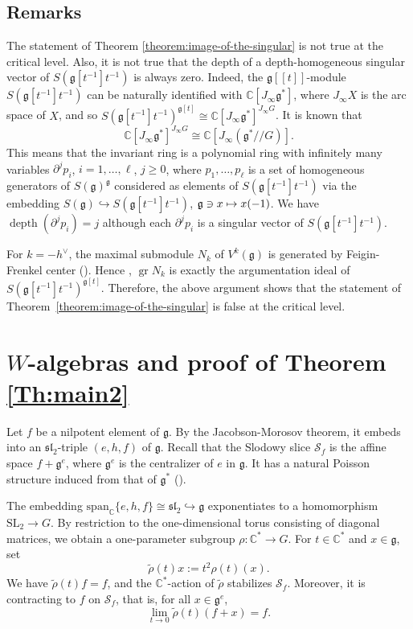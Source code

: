 \documentclass[JEP,XML,SOM,Unicode]{cedram}
\let\oldvee\vee
\renewcommand{\vee}{{\scriptscriptstyle\oldvee}}
\newcommand{\lcr}{[\![}
\newcommand{\rcr}{]\!]}
\newcommand\mto{\mathchoice{\longmapsto}{\mapsto}{\mapsto}{\mapsto}}
\let\on\operatorname
\newcommand\C{{\mathbb C}}
\newcommand \g{\mathfrak g}
\theoremstyle{definition}
\begin{document}
\subsection{Remarks}\label{subsection:remark}
The statement of Theorem \ref{theorem:image-of-the-singular}
is not true at the critical level.
Also,
it is not true that
the depth of a depth-homogeneous singular vector of $S(\g[t^{-1}]t^{-1})$ is
always zero.
Indeed,
the $\g\lcr t\rcr$-module
$S(\g[t^{-1}]t^{-1})$
can be naturally identified with $\C[J_{\infty}\g^*]$,
where $J_{\infty}X$ is the arc space of $X$,
and so
$S(\g[t^{-1}]t^{-1})^{\g[t]}\cong \C[J_{\infty}\g^*]^{J_{\infty}G}$.
It is known \cite{RaiTau92,BeiDri,EisFre01} that
\begin{equation*}
\C[J_{\infty}\g^*]^{J_{\infty}G}\cong \C[J_{\infty}(\g^*/\!/G)].
\end{equation*}
This means that
the invariant ring is a polynomial ring with infinitely many
variables
$\partial^j p_i$,
$i=1,\dots, \ell$,
$j\geq 0$,
where
$p_1,\dots, p_{\ell}$ is a set of homogeneous generators of
$S(\g)^\g$
considered as elements of
$S(\g[t^{-1}]t^{-1})$ via the embedding
$S(\g)\hookrightarrow S(\g[t^{-1}]t^{-1})$,
$\g\ni x\mto x(-1)$.
We have $\on{depth}(\partial^j p_i)=j$
although
each $\partial^j p_i$ is a singular vector
of $S(\g[t^{-1}]t^{-1})$.

For $k=-h^{\vee}$,
the maximal submodule $N_k$ of $V^k(\g)$
is generated by Feigin-Frenkel center (\cite{FreGai04}).
Hence \cite{FeiFre92,Fre05},
$\on{gr}N_{k}$ is exactly the
argumentation ideal of
$S(\g[t^{-1}]t^{-1})^{\g[t]}$.
Therefore,
the above argument shows that
the statement of Theorem~\ref{theorem:image-of-the-singular}
is false at the critical level.

\section{\texorpdfstring{$W$}{W}-algebras and proof of Theorem \ref{Th:main2}}
\label{sec:W-algebras}
Let $f$ be a nilpotent element of $\g$. By the Jacobson-Morosov theorem,
it embeds into an $\mathfrak{sl}_2$-triple $(e,h,f)$ of $\g$.
Recall that the Slodowy slice $\mathscr{S}_f$ is the affine space $f+\g^{e}$,
where $\g^{e}$ is the centralizer of $e$ in $\g$.
It has a natural Poisson structure induced from that of $\g^*$ (\cite{GanGin02}).

The embedding $\mathrm{span}_\C\{e,h,f\}
\cong \mathfrak{sl}_2 \hookrightarrow \g$
exponentiates to a homomorphism
\hbox{$\mathrm{SL}_2\!\to\!G$}. By restriction to the one-dimensional
torus consisting of diagonal matrices, we obtain
a one-parameter subgroup $\rho \colon \C^* \to G$.
For $t\in\C^*$ and $x\in\g$, set
\begin{equation*} \label{eq:rho}
\tilde{\rho}(t)x := t^{2} \rho(t)(x).
\end{equation*}
We have
$\tilde{\rho}(t)f=f$, and
the $\C^*$-action of $\tilde{\rho}$ stabilizes $\mathscr{S}_f$.
Moreover, it is contracting to $f$ on $\mathscr{S}_f$, that is, for all $x\in\g^{e}$,
\[
\lim_{t\to 0} \tilde{\rho}(t)(f+x)=f.
\]
\end{document}
